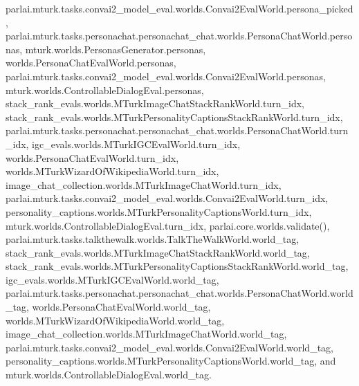 parlai.\+mturk.\+tasks.\+convai2\+\_\+model\+\_\+eval.\+worlds.\+Convai2\+Eval\+World.\+persona\+\_\+picked, parlai.\+mturk.\+tasks.\+personachat.\+personachat\+\_\+chat.\+worlds.\+Persona\+Chat\+World.\+personas, mturk.\+worlds.\+Personas\+Generator.\+personas, worlds.\+Persona\+Chat\+Eval\+World.\+personas, parlai.\+mturk.\+tasks.\+convai2\+\_\+model\+\_\+eval.\+worlds.\+Convai2\+Eval\+World.\+personas, mturk.\+worlds.\+Controllable\+Dialog\+Eval.\+personas, stack\+\_\+rank\+\_\+evals.\+worlds.\+M\+Turk\+Image\+Chat\+Stack\+Rank\+World.\+turn\+\_\+idx, stack\+\_\+rank\+\_\+evals.\+worlds.\+M\+Turk\+Personality\+Captions\+Stack\+Rank\+World.\+turn\+\_\+idx, parlai.\+mturk.\+tasks.\+personachat.\+personachat\+\_\+chat.\+worlds.\+Persona\+Chat\+World.\+turn\+\_\+idx, igc\+\_\+evals.\+worlds.\+M\+Turk\+I\+G\+C\+Eval\+World.\+turn\+\_\+idx, worlds.\+Persona\+Chat\+Eval\+World.\+turn\+\_\+idx, worlds.\+M\+Turk\+Wizard\+Of\+Wikipedia\+World.\+turn\+\_\+idx, image\+\_\+chat\+\_\+collection.\+worlds.\+M\+Turk\+Image\+Chat\+World.\+turn\+\_\+idx, parlai.\+mturk.\+tasks.\+convai2\+\_\+model\+\_\+eval.\+worlds.\+Convai2\+Eval\+World.\+turn\+\_\+idx, personality\+\_\+captions.\+worlds.\+M\+Turk\+Personality\+Captions\+World.\+turn\+\_\+idx, mturk.\+worlds.\+Controllable\+Dialog\+Eval.\+turn\+\_\+idx, parlai.\+core.\+worlds.\+validate(), parlai.\+mturk.\+tasks.\+talkthewalk.\+worlds.\+Talk\+The\+Walk\+World.\+world\+\_\+tag, stack\+\_\+rank\+\_\+evals.\+worlds.\+M\+Turk\+Image\+Chat\+Stack\+Rank\+World.\+world\+\_\+tag, stack\+\_\+rank\+\_\+evals.\+worlds.\+M\+Turk\+Personality\+Captions\+Stack\+Rank\+World.\+world\+\_\+tag, igc\+\_\+evals.\+worlds.\+M\+Turk\+I\+G\+C\+Eval\+World.\+world\+\_\+tag, parlai.\+mturk.\+tasks.\+personachat.\+personachat\+\_\+chat.\+worlds.\+Persona\+Chat\+World.\+world\+\_\+tag, worlds.\+Persona\+Chat\+Eval\+World.\+world\+\_\+tag, worlds.\+M\+Turk\+Wizard\+Of\+Wikipedia\+World.\+world\+\_\+tag, image\+\_\+chat\+\_\+collection.\+worlds.\+M\+Turk\+Image\+Chat\+World.\+world\+\_\+tag, parlai.\+mturk.\+tasks.\+convai2\+\_\+model\+\_\+eval.\+worlds.\+Convai2\+Eval\+World.\+world\+\_\+tag, personality\+\_\+captions.\+worlds.\+M\+Turk\+Personality\+Captions\+World.\+world\+\_\+tag, and mturk.\+worlds.\+Controllable\+Dialog\+Eval.\+world\+\_\+tag.

